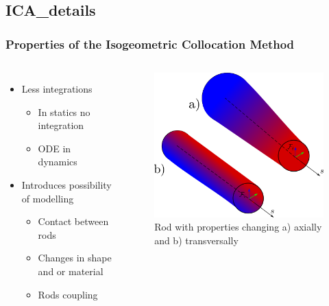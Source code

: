 \documentclass[compress]{thesisbeamer}
\begin{document}
		\subsection{ICA_details}
        \begin{frame}
        	\frametitle{Properties of the Isogeometric Collocation Method}
        	\begin{columns}
			\begin{itemize}%
  				\item Less integrations
  				\begin{itemize}
  					\item In statics no integration
  					\item ODE in dynamics
  				\end{itemize}
  				\item Introduces possibility of modelling
  				\begin{itemize}
  					\item Contact between rods
  					\item Changes in shape and or material 
  					\item Rods coupling
  				\end{itemize}
 			\end{itemize}
 			\vspace{2cm}
			\begin{figure}[h]
				\centering
				\includegraphics[width=\textwidth]{images/AV_TV}
				\caption{Rod with properties changing a) axially and b) transversally}
			\end{figure}
			\end{columns}
		\end{frame}
\end{document}
